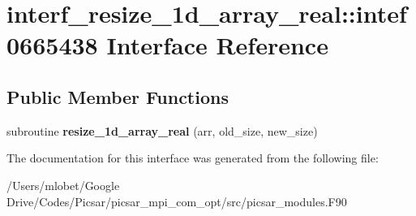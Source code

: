 \hypertarget{interfaceinterf__resize__1d__array__real_1_1intef0665438}{}\section{interf\+\_\+resize\+\_\+1d\+\_\+array\+\_\+real\+:\+:intef0665438 Interface Reference}
\label{interfaceinterf__resize__1d__array__real_1_1intef0665438}
\subsection*{Public Member Functions}
\begin{DoxyCompactItemize}
\item 
subroutine {\bfseries resize\+\_\+1d\+\_\+array\+\_\+real} (arr, old\+\_\+size, new\+\_\+size)\hypertarget{interfaceinterf__resize__1d__array__real_1_1intef0665438_af3b54aac72080c045566a2bb272619e4}{}\label{interfaceinterf__resize__1d__array__real_1_1intef0665438_af3b54aac72080c045566a2bb272619e4}

\end{DoxyCompactItemize}


The documentation for this interface was generated from the following file\+:\begin{DoxyCompactItemize}
\item 
/\+Users/mlobet/\+Google Drive/\+Codes/\+Picsar/picsar\+\_\+mpi\+\_\+com\+\_\+opt/src/picsar\+\_\+modules.\+F90\end{DoxyCompactItemize}
